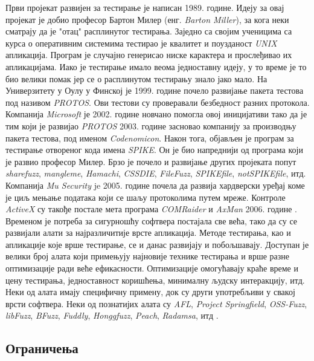 \documentclass[12pt,oneside]{memoir}
\begin{document}
Први пројекат развијен за тестирање је написан 1989. године. Идеју за овај пројекат је добио професор Бартон Милер (енг. \textit{Barton Miller}), за кога неки сматрају да је "отац" расплинутог тестирања. Заједно са својим ученицима са курса о оперативним системима тестирао је квалитет и поузданост \textit{UNIX} апликација. Програм је случајно генерисао ниске карактера и прослеђивао их апликацијама. Иако је тестирање имало веома једноставну идеју, у то време је то био велики помак јер се о расплинутом тестирању знало јако мало. На Универзитету у Оулу у Финској је 1999. године почело развијање пакета тестова под називом \textit{PROTOS}. Ови тестови су проверавали безбедност разних протокола. Компанија \textit{Microsoft} је 2002. године новчано помогла овој иницијативи тако да је тим који је развијао \textit{PROTOS} 2003. године засновао компанију за производњу пакета тестова, под именом \textit{Codenomicon}. Након тога, објављен је програм за тестирање отвореног кода имена \textit{SPIKE}. Он је био напреднији од програма који је развио професор Милер. Брзо је почело и развијање других пројеката попут \textit{sharefuzz}, \textit{mangleme}, \textit{Hamachi}, \textit{CSSDIE}, \textit{FileFuzz}, \textit{SPIKEfile}, \textit{notSPIKEfile}, итд. Компанија \textit{Mu Security} je 2005. године почела да развија хардверски уређај коме је циљ мењање података који се шаљу протоколима путем мреже. Контроле \textit{ActiveX} су такође постале мета програма \textit{COMRaider} и \textit{AxMan} 2006. године \cite{fuzzingBrute, fuzzing}. Временом је потреба за сигурношћу софтвера постајала све већа, тако да су се развијали алати за најразличитије врсте апликација. Методе тестирања, као и апликације које врше тестирање, се и данас развијају и побољшавају. Доступан је велики број алата који примењују најновије технике тестирања и врше разне оптимизације ради веће ефикасности. Оптимизације омогућавају краће време и цену тестирања, једноставност коришћења, минималну људску интеракцију, итд. Неки од алата имају специфичну примену, док су други употребљиви у свакој врсти софтвера. Неки од познатијих алата су \textit{AFL}, \textit{Project Springfield}, \textit{OSS-Fuzz}, \textit{libFuzz}, \textit{BFuzz}, \textit{Fuddly}, \textit{Honggfuzz}, \textit{Peach}, \textit{Radamsa}, итд \cite{bestFuzzers, fuzzingBrute, fuzzing}. 

\subsection{Ограничења}
\label{subsec:ogranicenja}
\end{document}
